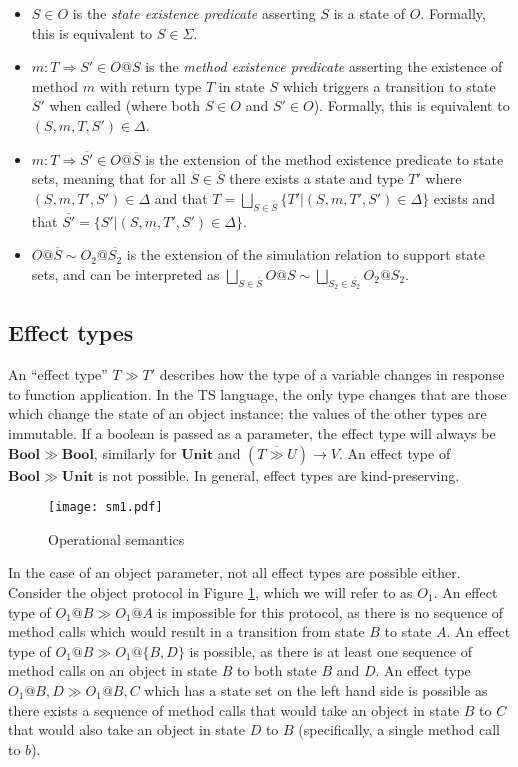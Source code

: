 \documentclass[preprint]{sigplanconf}
\newcommand{\figref}[1]{Figure \ref{#1}}
\newcommand{\unitt}{\mathbf{Unit}}
\newcommand{\boolt}{\mathbf{Bool}}
\newcommand{\funt}[3]{(\overline{#1 \gg #2}) \rightarrow #3}
\begin{document}
\begin{itemize}
\item $S \in O$ is the {\it state existence predicate} asserting 
$S$ is a state of $O$. 
Formally, this is equivalent to $S \in \Sigma$.
\item $m : T \Rightarrow S' \in O@S$ is the {\it method existence predicate} 
asserting the existence
of method $m$ with return type $T$ in state $S$ which triggers a 
transition to state $S'$ when called (where both $S \in O$ and $S' \in O$). 
Formally, this is equivalent to $(S,m,T,S') \in \Delta$.
\item $m : T \Rightarrow \overline{S'} \in O@\overline{S}$ is the extension
of the method existence predicate to state sets, meaning that for all 
$S \in \overline{S}$ there exists a state and type 
$T'$ where $(S,m,T',S') \in \Delta$ and that
$T = \bigsqcup_{S \in \overline{S}} \{ T' | (S,m,T',S') \in \Delta \}$ exists
and that $\overline{S'} = \{ S' | (S,m,T',S') \in \Delta \}$.
\item $O@\overline{S} \sim O_2@\overline{S_2}$ is the extension of the
simulation relation to support state sets, and can be interpreted as
$\bigsqcup_{S \in \overline{S}}O@S \sim \bigsqcup_{S_2 \in \overline{S_2}}O_2@S_2$.
\end{itemize}

\subsection{Effect types}

An ``effect type'' $T \gg T'$ describes how the type of a variable changes
in response to function application. In the TS language, the only type
changes that are those which change the state of an object instance; the
values of the other types are immutable. If a boolean is passed as a parameter,
the effect type will always be $\boolt \gg \boolt$, similarly for
$\unitt$ and $\funt{T}{U}{V}$. An effect type of $\boolt \gg \unitt$ is not
possible. In general, effect types are kind-preserving.

\begin{figure}
\texttt{[image: sm1.pdf]}
\caption{\label{fig:sm1} Operational semantics}
\end{figure}

In the case of an object parameter, not all effect types are possible
either. Consider
the object protocol in \figref{fig:sm1}, which we will refer to as $O_1$.
An effect type of $O_1@B \gg O_1@A$ is impossible for this protocol, as there
is no sequence of method calls which would result in a transition from state
$B$ to state $A$. An effect type of $O_1@B \gg O_1@\{B,D\}$ is possible, 
as there is at least one sequence of method calls on an object in
state $B$ to both state $B$ and $D$.
An effect type $O_1@{B,D} \gg O_1@{B,C}$ which has a state set on
the left hand side is possible as there exists a sequence of method calls 
that would take an object in state $B$ to $C$ that would also
take an object in state $D$ to $B$ (specifically, a single method
call to $b$).
\end{document}
